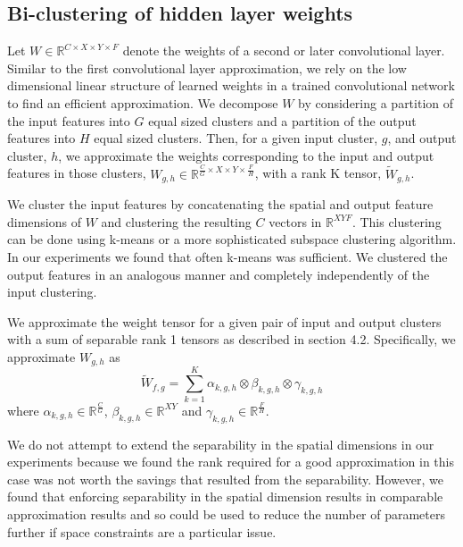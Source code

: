 \subsection{Bi-clustering of hidden layer weights}
Let $W \in \mathbb{R}^{C \times X \times Y \times F}$ denote the weights of a second or later convolutional layer. Similar to the first convolutional layer approximation, we rely on the low dimensional linear structure of learned weights in a trained convolutional network to find an efficient approximation. We decompose $W$ by considering a partition of the input features into $G$ equal sized clusters and a partition of the output features into $H$ equal sized clusters. Then, for a given input cluster, $g$, and output cluster, $h$, we approximate the weights corresponding to the input and output features in those clusters, $W_{g,h} \in \mathbb{R}^{\frac{C}{G} \times X \times Y \times \frac{F}{H}}$, with a rank K tensor, $\tilde{W}_{g,h}$.  

We cluster the input features by concatenating the spatial and output feature dimensions of $W$ and clustering the resulting $C$ vectors in $\mathbb{R}^{XYF}$. This clustering can be done using k-means or a more sophisticated subspace clustering algorithm. In our experiments we found that often k-means was sufficient. We clustered the output features in an analogous manner and completely independently of the input clustering. 

We approximate the weight tensor for a given pair of input and output clusters with a sum of separable rank 1 tensors as described in section 4.2. Specifically, we approximate $W_{g,h}$ as
\begin{equation*}
	\tilde{W}_{f,g} = \sum_{k=1}^{K} \alpha_{k,g,h} \otimes \beta_{k,g,h} \otimes \gamma_{k,g,h}
\end{equation*}
where $\alpha_{k,g,h} \in \mathbb{R}^{\frac{C}{G}}$, $\beta_{k,g,h} \in \mathbb{R}^{XY}$ and $\gamma_{k,g,h} \in \mathbb{R}^{\frac{F}{H}}$.

We do not attempt to extend the separability in the spatial dimensions in our experiments because we found the rank required for a good approximation in this case was not worth the savings that resulted from the separability. However, we found that enforcing separability in the spatial dimension results in comparable approximation results and so could be used to reduce the number of parameters further if space constraints are a particular issue. 

